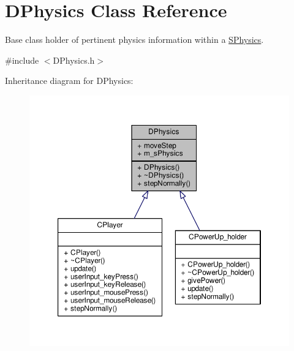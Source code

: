 \hypertarget{classDPhysics}{\section{D\-Physics Class Reference}
\label{classDPhysics}
}


Base class holder of pertinent physics information within a \hyperlink{structDPhysics_1_1SPhysics}{S\-Physics}.  




{\ttfamily \#include $<$D\-Physics.\-h$>$}



Inheritance diagram for D\-Physics\-:
\nopagebreak
\begin{figure}[H]
\begin{center}
\leavevmode
\includegraphics[width=350pt]{classDPhysics__inherit__graph}
\end{center}
\end{figure}


